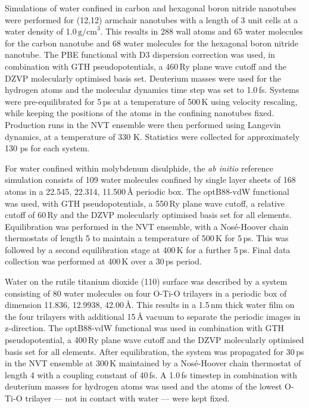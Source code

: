 \documentclass[aip,jcp,amsmath,amssymb,floatfix,reprint,citeautoscript,noeprint]{revtex4-1}
\begin{document}
\begin{bibunit}
%
Simulations of water confined in carbon and hexagonal boron nitride nanotubes
were performed for (12,12) armchair nanotubes with a length of 3 unit cells
at a water density of 1.0\,$\mathrm{g/cm}^{3}$.
%
This results in 288 wall atoms and 65 water molecules for the carbon nanotube
and 68 water molecules for the hexagonal boron nitride nanotube.
%
The PBE functional with D3 dispersion correction was used, in combination
with GTH pseudopotentials, a 460\,Ry plane wave cutoff and the
DZVP molecularly optimised basis set.
%
Deuterium masses were used for the hydrogen atoms and the molecular
dynamics time step was set to 1.0\,fs.
%
Systems were pre-equilibrated for 5\,ps at a temperature of 500\,K
using velocity rescaling, while keeping the positions of the atoms
in the confining nanotubes fixed.
%
Production runs in the NVT ensemble were then performed using Langevin dynamics,
at a temperature of 330 K.
%
Statistics were collected for approximately 130 ps for each system.

%
For water confined within molybdenum disulphide,
the \textit{ab initio} reference simulation consists
of 109 water molecules confined by single layer  sheets
of 168 atoms in a 22.545, 22.314, 11.500\,\AA{} periodic box.
%
The optB88-vdW functional was used, with GTH pseudopotentials, a 550\,Ry plane wave cutoff,
a relative cutoff of 60\,Ry and the DZVP molecularly optimised basis set for all elements.
%
%
%
%
Equilibration was performed in the NVT ensemble, with a Nosé-Hoover chain thermostats of length 5 to maintain a temperature of 500\,K for 5\,ps.
%
This was followed by a second equilibration stage at 400\,K for a further 5\,ps.
%
Final data collection was performed at 400\,K over a 30\,ps period.

%
Water on the rutile titanium dioxide (110) surface was described by a system
consisting of 80 water molecules on four O-Ti-O trilayers
in a periodic box of dimension 11.836, 12.9938, 42.00\,\AA{}.
%
This results in a 1.5\,nm thick water film on the four
trilayers with additional 15\,\AA{} vacuum to separate the
periodic images in z-direction.
%
The optB88-vdW functional was used in combination with GTH pseudopotential,
a 400\,Ry plane wave cutoff and the DZVP molecularly optimised basis set for all elements.
%
After equilibration, the system was propagated for 30\,ps in the NVT ensemble at 300\,K
maintained by a Nosé-Hoover chain thermostat of length 4 with a coupling constant
of 40\,fs.
%
A 1.0\,fs timestep in combination with deuterium masses for hydrogen atoms
was used and the atoms of the lowest O-Ti-O trilayer --- not in contact with
water --- were kept fixed.


\end{bibunit}
\end{document}
